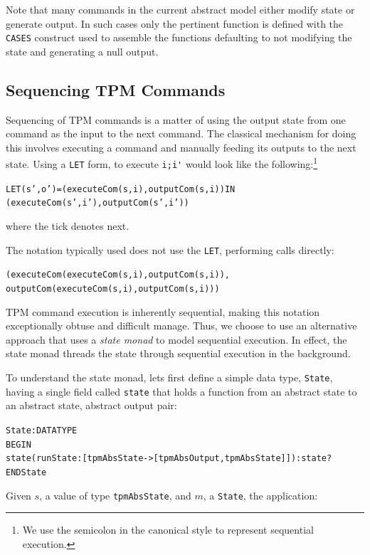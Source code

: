 \documentclass[10pt]{article}
\begin{document}
Note that many commands in the current abstract model either modify
state or generate output.  In such cases only the pertinent function
is defined with the \verb!CASES! construct used to assemble the
functions defaulting to not modifying the state and generating a null
output.

\subsection{Sequencing TPM Commands}

Sequencing of TPM commands is a matter of using the output state from
one command as the input to the next command.  The classical mechanism
for doing this involves executing a command and manually feeding its
outputs to the next state.  Using a \verb!LET! form, to execute
\verb!i;i'! would look like the following:\footnote{We use the
  semicolon in the canonical style to represent sequential execution.}

\begin{alltt}
  LET (s',o') = (executeCom(s,i),outputCom(s,i)) IN
    (executeCom(s',i'),outputCom(s',i'))
\end{alltt}

\noindent where the tick denotes next.

The notation typically used does not use the \verb!LET!, performing
calls directly:

\begin{alltt}
    (executeCom(executeCom(s,i),outputCom(s,i)),
     outputCom(executeCom(s,i),outputCom(s,i)))
\end{alltt}

TPM command execution is inherently sequential, making this notation
exceptionally obtuse and difficult manage.  Thus, we choose to use an
alternative approach that uses a \emph{state monad} to model
sequential execution.  In effect, the state monad threads the state
through sequential execution in the background.

To understand the state monad, lets first define a simple data type,
\verb!State!, having a single field called \verb!state! that holds a
function from an abstract state to an abstract state, abstract output
pair:

\begin{alltt}
 State : DATATYPE
 BEGIN
   state(runState:[tpmAbsState->[tpmAbsOutput,tpmAbsState]]):state?
 END State
\end{alltt}

Given $s$, a value of type \verb!tpmAbsState!, and $m$, a \verb!State!, the
application:
\end{document}
